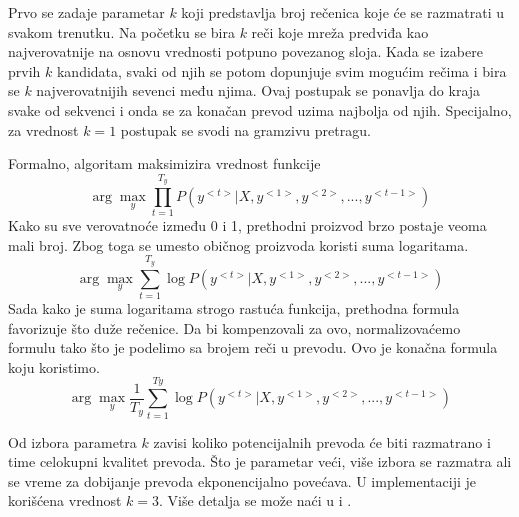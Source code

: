 \documentclass[a4paper]{article}
\begin{document}
Prvo se zadaje parametar $k$ koji predstavlja broj rečenica koje će se razmatrati u svakom trenutku. Na početku se bira $k$ reči koje mreža predviđa kao najverovatnije na osnovu vrednosti potpuno povezanog sloja. Kada se izabere prvih $k$ kandidata, svaki od njih se potom dopunjuje svim mogućim rečima i bira se $k$ najverovatnijih sevenci među njima.
Ovaj postupak se ponavlja do kraja svake od sekvenci i onda se za konačan prevod uzima najbolja od njih. Specijalno, za vrednost $k = 1$ postupak se svodi na gramzivu pretragu.

Formalno, algoritam maksimizira vrednost funkcije
$$\arg\max_{y} \prod_{t=1}^{T_y} P(y^{<t>}|X, y^{<1>}, y^{<2>}, ..., y^{<t-1>})$$
Kako su sve verovatnoće između 0 i 1, prethodni proizvod brzo postaje veoma mali broj. Zbog toga se umesto običnog proizvoda koristi suma logaritama.
$$\arg\max_{y} \sum_{t=1}^{T_y} \log P(y^{<t>}|X, y^{<1>}, y^{<2>}, ..., y^{<t-1>})$$
Sada kako je suma logaritama strogo rastuća funkcija, prethodna formula favorizuje što duže rečenice. Da bi kompenzovali za ovo, normalizovaćemo formulu tako što je podelimo sa brojem reči u prevodu. Ovo je konačna formula koju koristimo.
$$\arg\max_{y} \frac{1}{T_y} \sum_{t=1}^{Ty} \log P(y^{<t>}|X, y^{<1>}, y^{<2>}, ..., y^{<t-1>})$$

Od izbora parametra $k$ zavisi koliko potencijalnih prevoda će biti razmatrano i time celokupni kvalitet prevoda. Što je parametar veći, više izbora se razmatra ali se vreme za dobijanje prevoda ekponencijalno povećava. U implementaciji je korišćena vrednost $k = 3$. Više detalja se može naći u \cite{Freitag_2017} i \cite{aritificial2009}.

\end{document}
